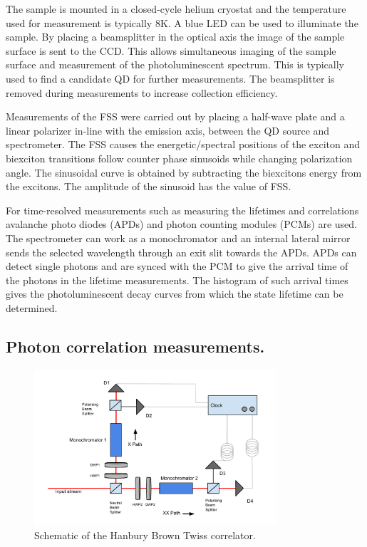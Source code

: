 \documentclass[12pt, twoside]{article}
\numberwithin{equation}{section}
\begin{document}
The sample is mounted in a closed-cycle helium cryostat and the
temperature used for measurement is typically 8K. A blue LED can be used
to illuminate the sample. By placing a beamsplitter in the optical axis
the image of the sample surface is sent to the CCD. This allows
simultaneous imaging of the sample surface and measurement of the
photoluminescent spectrum. This is typically used to find a candidate QD
for further measurements. The beamsplitter is removed during
measurements to increase collection efficiency.

Measurements of the FSS were carried out by placing a half-wave plate
and a linear polarizer in-line with the emission axis, between the QD
source and spectrometer. The FSS causes the energetic/spectral positions
of the exciton and biexciton transitions follow counter phase sinusoids
while changing polarization angle. The sinusoidal curve is obtained by
subtracting the biexcitons energy from the excitons. The amplitude of
the sinusoid has the value of FSS.

For time-resolved measurements such as measuring the lifetimes and
correlations avalanche photo diodes (APDs) and photon counting modules
(PCMs) are used. The spectrometer can work as a monochromator and an
internal lateral mirror sends the selected wavelength through an exit
slit towards the APDs. APDs can detect single photons and are synced
with the PCM to give the arrival time of the photons in the lifetime
measurements. The histogram of such arrival times gives the
photoluminescent decay curves from which the state lifetime can be
determined.

\subsection{Photon correlation
measurements.}\label{photon-correlation-measurements.}

\begin{figure}[h!]
    \centering
    \includegraphics[width=0.8\textwidth]{images/hbt.pdf}
    \caption{Schematic of the Hanbury Brown Twiss correlator.}
    \label{fig:hbt}
\end{figure}
\end{document}
